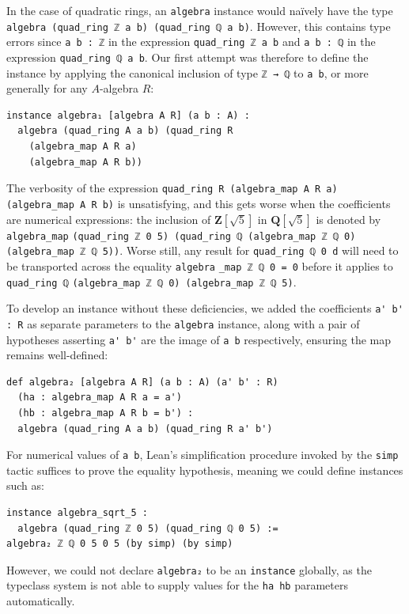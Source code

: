 \documentclass[sigplan,10pt,nonacm,
screen]{acmart} \settopmatter{printfolios=true,printccs=false,printacmref=false}
\newcommand{\QQ}{\mathbf{Q}}
\newcommand{\ZZ}{\mathbf{Z}}
\begin{document}
In the case of quadratic rings, an \lstinline{algebra} instance would naïvely have the type \lstinline{algebra (quad_ring ℤ a b) (quad}\-\lstinline{_ring ℚ a b)}. %
However, this contains type errors since \lstinline{a b : ℤ} in the expression \lstinline{quad_ring ℤ a b} and \lstinline{a b : ℚ} in the expression \lstinline{quad_ring ℚ a b}.
Our first attempt was therefore to define the instance by applying the canonical inclusion of type \lstinline{ℤ → ℚ} to \lstinline{a b},
or more generally for any $A$-algebra $R$:
\begin{lstlisting}
instance algebra₁ [algebra A R] (a b : A) :
  algebra (quad_ring A a b) (quad_ring R
    (algebra_map A R a)
    (algebra_map A R b))
\end{lstlisting}
The verbosity of the expression \lstinline{quad_ring R (algebra_map A R a) (algebra_map A R b)} is unsatisfying,
and this gets worse when the coefficients are numerical expressions:
the inclusion of $\ZZ[\sqrt{5}]$ in $\QQ[\sqrt{5}]$
is denoted by \lstinline{algebra_map} \lstinline{(quad_ring ℤ 0 5) (quad_ring ℚ (algebra_map ℤ ℚ 0)}\\ \lstinline{(algebra_map ℤ ℚ 5))}.
Worse still, any result for \lstinline{quad}\-\lstinline{_ring ℚ 0 d} will need to be transported across the equality \lstinline{algebra}\-%
\lstinline{_map ℤ ℚ 0 = 0}
before it applies to \lstinline{quad_ring ℚ} \lstinline{(algebra_}\-\lstinline{map ℤ ℚ 0) (algebra_map ℤ ℚ 5)}.

    To develop an instance without these deficiencies,
    we added the coefficients \lstinline{a' b' : R} as separate parameters to the \lstinline{algebra} instance,
    along with a pair of hypotheses asserting \lstinline{a' b'} are the image of \lstinline{a b} respectively,
    ensuring the map remains well-defined:
\begin{lstlisting}
def algebra₂ [algebra A R] (a b : A) (a' b' : R)
  (ha : algebra_map A R a = a')
  (hb : algebra_map A R b = b') :
  algebra (quad_ring A a b) (quad_ring R a' b')
\end{lstlisting}
    For numerical values of \lstinline{a b}, Lean's simplification procedure invoked by the \lstinline{simp} tactic suffices to prove the equality hypothesis,
    meaning we could define instances such as:
\begin{lstlisting}
instance algebra_sqrt_5 :
  algebra (quad_ring ℤ 0 5) (quad_ring ℚ 0 5) :=
algebra₂ ℤ ℚ 0 5 0 5 (by simp) (by simp)
\end{lstlisting}
    However, we could not declare \lstinline{algebra₂} to be an \lstinline{instance} globally,
    as the typeclass system is not able to supply values for the \lstinline{ha hb} parameters automatically.
\end{document}
